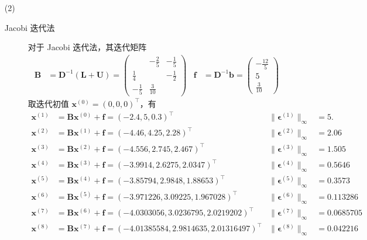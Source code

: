 \documentclass{sjtuarticle}
\begin{document}
\begin{itemize}
\begin{solution}
\begin{itemize}
        \item[(2)] 
        \begin{description}
            \item[Jacobi 迭代法] 
        对于 Jacobi 迭代法，其迭代矩阵
        \begin{align*}
            \bm{B}&=\bm{D}^{-1}(\bm{L}+\bm{U})=\begin{pmatrix}
                & -\frac{2}{5} & -\frac{1}{5} \\
                \frac{1}{4} & & -\frac{1}{2} \\
                -\frac{1}{5} & \frac{3}{10} & 
            \end{pmatrix} & \bm{f}&=\bm{D}^{-1}\bm{b}=\begin{pmatrix}
                -\frac{12}{5} \\ 5 \\ \frac{3}{10}
            \end{pmatrix}
        \end{align*}
        取迭代初值 $\bm{x}^{(0)}=(0,0,0)^\top$，有
        \begin{align*}
            \bm{x}^{(1)}&=\bm{B}\bm{x}^{(0)}+\bm{f}=\left(-2.4, 5, 0.3\right)^\top & \lVert\bm{\epsilon}^{(1)}\rVert_{\infty}&=5. \\
            \bm{x}^{(2)}&=\bm{B}\bm{x}^{(1)}+\bm{f}=\left(-4.46, 4.25, 2.28\right)^\top & \lVert\bm{\epsilon}^{(2)}\rVert_{\infty}&=2.06 \\
            \bm{x}^{(3)}&=\bm{B}\bm{x}^{(2)}+\bm{f}=\left(-4.556, 2.745, 2.467\right)^\top & \lVert\bm{\epsilon}^{(3)}\rVert_{\infty}&=1.505 \\
            \bm{x}^{(4)}&=\bm{B}\bm{x}^{(3)}+\bm{f}=\left(-3.9914, 2.6275, 2.0347\right)^\top & \lVert\bm{\epsilon}^{(4)}\rVert_{\infty}&=0.5646 \\
            \bm{x}^{(5)}&=\bm{B}\bm{x}^{(4)}+\bm{f}=\left(-3.85794, 2.9848, 1.88653\right)^\top & \lVert\bm{\epsilon}^{(5)}\rVert_{\infty}&=0.3573 \\
            \bm{x}^{(6)}&=\bm{B}\bm{x}^{(5)}+\bm{f}=\left(-3.971226, 3.09225, 1.967028\right)^\top & \lVert\bm{\epsilon}^{(6)}\rVert_{\infty}&=0.113286 \\
            \bm{x}^{(7)}&=\bm{B}\bm{x}^{(6)}+\bm{f}=\left(-4.0303056, 3.0236795, 2.0219202\right)^\top & \lVert\bm{\epsilon}^{(7)}\rVert_{\infty}&=0.0685705 \\
            \bm{x}^{(8)}&=\bm{B}\bm{x}^{(7)}+\bm{f}=\left(-4.01385584, 2.9814635, 2.01316497\right)^\top & \lVert\bm{\epsilon}^{(8)}\rVert_{\infty}&=0.042216 \\

\end{align*}
\end{description}
\end{itemize}
\end{solution}
\end{itemize}
\end{document}
